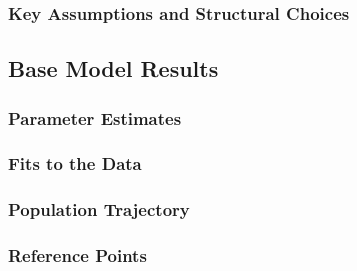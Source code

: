\documentclass[11pt,
  english,
  a4paper,
]{article}
\begin{document}
\leavevmode\tagmcend\tagstructend\par


\hypertarget{key-assumptions-and-structural-choices}{%
\subsubsection{Key Assumptions and Structural Choices}\label{key-assumptions-and-structural-choices}}

\leavevmode\tagmcend\tagstructend


\hypertarget{base-model-results}{%
\subsection{Base Model Results}\label{base-model-results}}

\leavevmode\tagmcend\tagstructend


\hypertarget{parameter-estimates}{%
\subsubsection{Parameter Estimates}\label{parameter-estimates}}

\leavevmode\tagmcend\tagstructend


\hypertarget{fits-to-the-data}{%
\subsubsection{Fits to the Data}\label{fits-to-the-data}}

\leavevmode\tagmcend\tagstructend


\hypertarget{population-trajectory}{%
\subsubsection{Population Trajectory}\label{population-trajectory}}

\leavevmode\tagmcend\tagstructend


\hypertarget{reference-points-1}{%
\subsubsection{Reference Points}\label{reference-points-1}}
\end{document}
